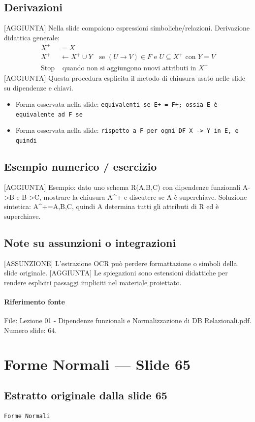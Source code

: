 \documentclass[11pt]{article}
\begin{document}
\subsection*{Derivazioni}
[AGGIUNTA] Nella slide compaiono espressioni simboliche/relazioni. Derivazione didattica generale:
\begin{align*}
X^+ &= X \\
X^+ &\leftarrow X^+ \cup Y \quad \text{se } (U \to V) \in F \text{ e } U \subseteq X^+ \text{ con } Y=V \\
\text{Stop} &\text{ quando non si aggiungono nuovi attributi in } X^+
\end{align*}
[AGGIUNTA] Questa procedura esplicita il metodo di chiusura usato nelle slide su dipendenze e chiavi.
\begin{itemize}[leftmargin=*]
\item Forma osservata nella slide: \texttt{equivalenti se E+ = F+; ossia E è equivalente ad F se}
\item Forma osservata nella slide: \texttt{rispetto a F per ogni DF X -> Y in E, e quindi}
\end{itemize}
\subsection*{Esempio numerico / esercizio}
[AGGIUNTA] Esempio: dato uno schema R(A,B,C) con dipendenze funzionali A->B e B->C, mostrare la chiusura A^+ e discutere se A è superchiave. Soluzione sintetica: A^+={A,B,C}, quindi A determina tutti gli attributi di R ed è superchiave.
\subsection*{Note su assunzioni o integrazioni}
[ASSUNZIONE] L'estrazione OCR può perdere formattazione o simboli della slide originale.
[AGGIUNTA] Le spiegazioni sono estensioni didattiche per rendere espliciti passaggi impliciti nel materiale proiettato.
\paragraph{Riferimento fonte} File: Lezione 01 - Dipendenze funzionali e Normalizzazione di DB Relazionali.pdf. Numero slide: 64.
\section{Forme Normali --- Slide 65}
\subsection*{Estratto originale dalla slide 65}
\begin{lstlisting}
Forme Normali
\end{lstlisting}
\end{document}
